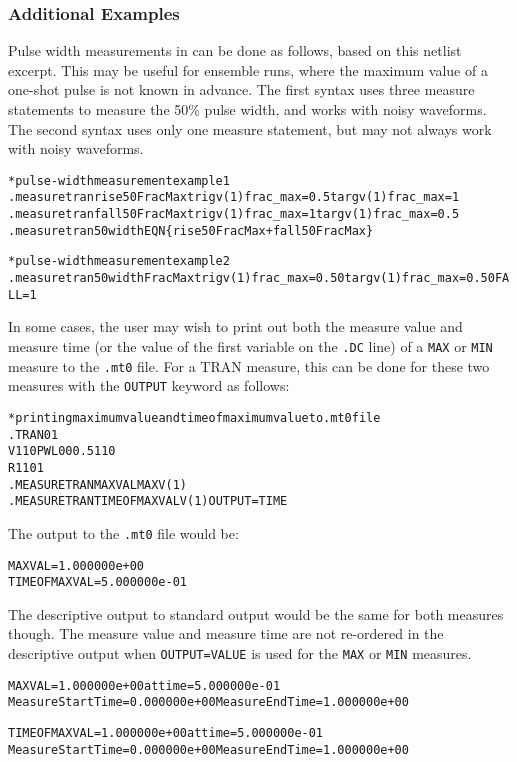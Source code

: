 \subsubsection{Additional Examples}
\label{Measure_Additional_Examples}
Pulse width measurements in \Xyce{} can be done as follows, based on this netlist 
excerpt.  This may be useful for ensemble runs, where the maximum value of a one-shot 
pulse is not known in advance.  The first syntax uses three measure statements to measure
the 50\% pulse width, and works with noisy waveforms.  The second syntax uses only 
one measure statement, but may not always work with noisy waveforms.

\begin{alltt}
* pulse-width measurement example 1
.measure tran rise50FracMax trig v(1) frac_max=0.5 targ v(1) frac_max=1
.measure tran fall50FracMax trig v(1) frac_max=1 targ v(1) frac_max=0.5
.measure tran 50width EQN\{rise50FracMax + fall50FracMax\}

* pulse-width measurement example 2
.measure tran 50widthFracMax trig v(1) frac_max=0.50 targ v(1) frac_max=0.50 FALL=1
\end{alltt}

In some cases, the user may wish to print out both the measure value and measure time
(or the value of the first variable on the {\tt .DC} line) of a 
\texttt{MAX} or \texttt{MIN} measure to the \texttt{.mt0} file.  For a TRAN measure,
this can be done for these two measures with the \texttt{OUTPUT} keyword as follows:
\begin{alltt}
* printing maximum value and time of maximum value to .mt0 file
.TRAN 0 1
V1 1 0 PWL 0 0 0.5 1 1 0
R1 1 0 1
.MEASURE TRAN MAXVAL MAX V(1) 
.MEASURE TRAN TIMEOFMAXVAL V(1) OUTPUT=TIME 
\end{alltt}
The output to the \texttt{.mt0} file would be:
\begin{alltt}
MAXVAL = 1.000000e+00
TIMEOFMAXVAL = 5.000000e-01
\end{alltt}
The descriptive output to standard output would be the same for both measures
though.  The measure value and measure time are not re-ordered in the 
descriptive output when \texttt{OUTPUT=VALUE} is used for the \texttt{MAX} or 
\texttt{MIN} measures.
\begin{alltt}
MAXVAL = 1.000000e+00 at time = 5.000000e-01
Measure Start Time= 0.000000e+00        Measure End Time= 1.000000e+00

TIMEOFMAXVAL = 1.000000e+00 at time = 5.000000e-01
Measure Start Time= 0.000000e+00        Measure End Time= 1.000000e+00
\end{alltt}

